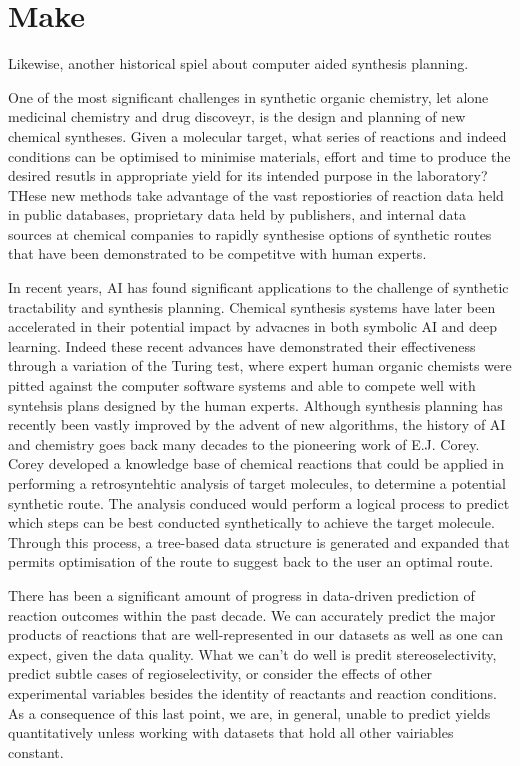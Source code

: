 \section*{Make}
Likewise, another historical spiel about computer aided synthesis planning.

One of the most significant challenges in synthetic organic chemistry, let alone medicinal chemistry and drug discoveyr, is the design and planning of new chemical syntheses. Given a molecular target, what series of reactions and indeed conditions can be optimised to minimise materials, effort and time to produce the desired resutls in appropriate yield for its intended purpose in the laboratory? THese new methods take advantage of the vast repostiories of reaction data held in public databases, proprietary data held by publishers, and internal data sources at chemical companies to rapidly synthesise options of synthetic routes that have been demonstrated to be competitve with human experts. 

In recent years, AI has found significant applications to the challenge of synthetic tractability and synthesis planning. Chemical synthesis systems have later been accelerated in their potential impact by advacnes in both symbolic AI and deep learning. Indeed these recent advances have demonstrated their effectiveness through a variation of the Turing test, where expert human organic chemists were pitted against the computer software systems and able to compete well with syntehsis plans designed by the human experts. Although synthesis planning has recently been vastly improved by the advent of new algorithms, the history of AI and chemistry goes back many decades to the pioneering work of E.J. Corey. Corey developed a knowledge base of chemical reactions that could be applied in performing a retrosyntehtic analysis of target molecules, to determine a potential synthetic route. The analysis conduced would perform a logical process to predict which steps can be best conducted synthetically to achieve the target molecule. Through this process, a tree-based data structure is generated and expanded that permits optimisation of the route to suggest back to the user an optimal route.

There has been a significant amount of progress in data-driven prediction of reaction outcomes within the past decade. We can accurately predict the major products of reactions that are well-represented in our datasets as well as one can expect, given the data quality. What we can't do well is predit stereoselectivity, predict subtle cases of regioselectivity, or consider the effects of other experimental variables besides the identity of reactants and reaction conditions. As a consequence of this last point, we are, in general, unable to predict yields quantitatively unless working with datasets that hold all other vairiables constant. 

